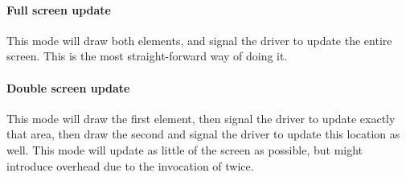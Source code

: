 \paragraph{Full screen update}
This mode will draw both elements, and signal the driver to update the entire screen. This is the most straight-forward way of doing it.

\paragraph{Double screen update}
This mode will draw the first element, then signal the driver to update exactly that area, then draw the second and signal the driver to update this location as well. This mode will update as little of the screen as possible, but might introduce overhead due to the invocation of  twice.

